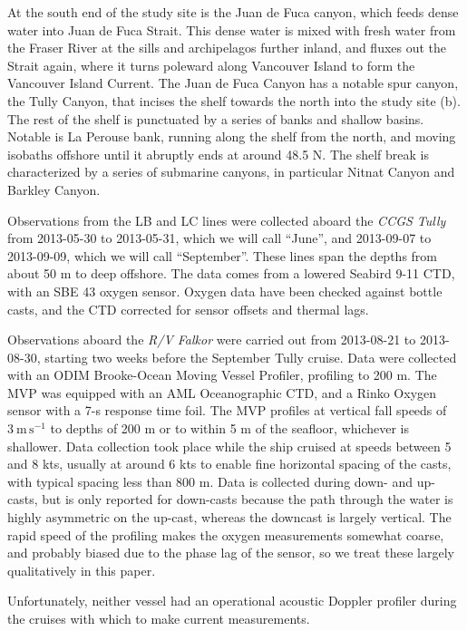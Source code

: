 \documentclass[draft]{agujournal2019}
\begin{document}
At the south end of the study site is the Juan de Fuca canyon, which feeds dense water into Juan de Fuca Strait.  This dense water is mixed with fresh water from the Fraser River at the sills and archipelagos further inland, and fluxes out the Strait again, where it turns poleward along Vancouver Island to form the Vancouver Island Current.  The Juan de Fuca Canyon has a notable spur canyon, the Tully Canyon, that incises the shelf towards the north into the study site (b).  The rest of the shelf is punctuated by a series of banks and shallow basins.  Notable is La Perouse bank, running along the shelf from the north, and moving isobaths offshore until it abruptly ends at around 48.5 N. The shelf break is characterized by a series of submarine canyons, in particular Nitnat Canyon and Barkley Canyon.


Observations from the LB and LC lines were collected aboard the \emph{CCGS Tully} from 2013-05-30 to 2013-05-31, which we will call ``June'', and 2013-09-07 to 2013-09-09, which we will call ``September''.  These lines span the depths from about 50 m to deep offshore.  The data comes from a lowered Seabird 9-11 CTD, with an SBE 43 oxygen sensor.  Oxygen data have been checked against bottle casts, and the CTD corrected for sensor offsets and thermal lags.

Observations aboard the \emph{R/V Falkor} were carried out from 2013-08-21 to 2013-08-30, starting two weeks before the September Tully cruise.  Data were collected with an ODIM Brooke-Ocean Moving Vessel Profiler, profiling to 200 m.  The MVP was equipped with an AML Oceanographic CTD, and a Rinko Oxygen sensor with a 7-s response time foil.  The MVP profiles at vertical fall speeds of $3\ \mathrm{m\,s^{-1}}$ to depths of 200 m or to within 5 m of the seafloor, whichever is shallower.  Data collection took place while the ship cruised at speeds between 5 and 8 kts, usually at around 6 kts to enable fine horizontal spacing of the casts, with typical spacing less than 800 m.  Data is collected during down- and up-casts, but is only reported for down-casts because the path through the water is highly asymmetric on the up-cast, whereas the downcast is largely vertical.  The rapid speed of the profiling makes the oxygen measurements somewhat coarse, and probably biased due to the phase lag of the sensor, so we treat these largely qualitatively in this paper.

Unfortunately, neither vessel had an operational acoustic Doppler profiler during the cruises with which to make current measurements.
\end{document}
